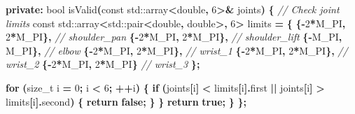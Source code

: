 \documentclass[
]{article}
\newenvironment{Shaded}{\begin{snugshade}}{\end{snugshade}}
\newcommand{\AttributeTok}[1]{\textcolor[rgb]{0.13,0.29,0.53}{#1}}
\newcommand{\BuiltInTok}[1]{#1}
\newcommand{\CommentTok}[1]{\textcolor[rgb]{0.56,0.35,0.01}{\textit{#1}}}
\newcommand{\ControlFlowTok}[1]{\textcolor[rgb]{0.13,0.29,0.53}{\textbf{#1}}}
\newcommand{\DataTypeTok}[1]{\textcolor[rgb]{0.13,0.29,0.53}{#1}}
\newcommand{\DecValTok}[1]{\textcolor[rgb]{0.00,0.00,0.81}{#1}}
\newcommand{\KeywordTok}[1]{\textcolor[rgb]{0.13,0.29,0.53}{\textbf{#1}}}
\newcommand{\NormalTok}[1]{#1}
\newcommand{\OperatorTok}[1]{\textcolor[rgb]{0.81,0.36,0.00}{\textbf{#1}}}
\begin{document}
\begin{Shaded}
\begin{Highlighting}[]
\KeywordTok{private}\OperatorTok{:}
    \DataTypeTok{bool}\NormalTok{ isValid}\OperatorTok{(}\AttributeTok{const} \BuiltInTok{std::}\NormalTok{array}\OperatorTok{\textless{}}\DataTypeTok{double}\OperatorTok{,} \DecValTok{6}\OperatorTok{\textgreater{}\&}\NormalTok{ joints}\OperatorTok{)} \OperatorTok{\{}
        \CommentTok{// Check joint limits}
        \AttributeTok{const} \BuiltInTok{std::}\NormalTok{array}\OperatorTok{\textless{}}\BuiltInTok{std::}\NormalTok{pair}\OperatorTok{\textless{}}\DataTypeTok{double}\OperatorTok{,} \DataTypeTok{double}\OperatorTok{\textgreater{},} \DecValTok{6}\OperatorTok{\textgreater{}}\NormalTok{ limits }\OperatorTok{=} \OperatorTok{\{}
            \OperatorTok{\{{-}}\DecValTok{2}\OperatorTok{*}\NormalTok{M\_PI}\OperatorTok{,} \DecValTok{2}\OperatorTok{*}\NormalTok{M\_PI}\OperatorTok{\},}  \CommentTok{// shoulder\_pan}
            \OperatorTok{\{{-}}\DecValTok{2}\OperatorTok{*}\NormalTok{M\_PI}\OperatorTok{,} \DecValTok{2}\OperatorTok{*}\NormalTok{M\_PI}\OperatorTok{\},}  \CommentTok{// shoulder\_lift}
            \OperatorTok{\{{-}}\NormalTok{M\_PI}\OperatorTok{,}\NormalTok{ M\_PI}\OperatorTok{\},}      \CommentTok{// elbow}
            \OperatorTok{\{{-}}\DecValTok{2}\OperatorTok{*}\NormalTok{M\_PI}\OperatorTok{,} \DecValTok{2}\OperatorTok{*}\NormalTok{M\_PI}\OperatorTok{\},}  \CommentTok{// wrist\_1}
            \OperatorTok{\{{-}}\DecValTok{2}\OperatorTok{*}\NormalTok{M\_PI}\OperatorTok{,} \DecValTok{2}\OperatorTok{*}\NormalTok{M\_PI}\OperatorTok{\},}  \CommentTok{// wrist\_2}
            \OperatorTok{\{{-}}\DecValTok{2}\OperatorTok{*}\NormalTok{M\_PI}\OperatorTok{,} \DecValTok{2}\OperatorTok{*}\NormalTok{M\_PI}\OperatorTok{\}}   \CommentTok{// wrist\_3}
        \OperatorTok{\};}

        \ControlFlowTok{for} \OperatorTok{(}\DataTypeTok{size\_t}\NormalTok{ i }\OperatorTok{=} \DecValTok{0}\OperatorTok{;}\NormalTok{ i }\OperatorTok{\textless{}} \DecValTok{6}\OperatorTok{;} \OperatorTok{++}\NormalTok{i}\OperatorTok{)} \OperatorTok{\{}
            \ControlFlowTok{if} \OperatorTok{(}\NormalTok{joints}\OperatorTok{[}\NormalTok{i}\OperatorTok{]} \OperatorTok{\textless{}}\NormalTok{ limits}\OperatorTok{[}\NormalTok{i}\OperatorTok{].}\NormalTok{first }\OperatorTok{||}\NormalTok{ joints}\OperatorTok{[}\NormalTok{i}\OperatorTok{]} \OperatorTok{\textgreater{}}\NormalTok{ limits}\OperatorTok{[}\NormalTok{i}\OperatorTok{].}\NormalTok{second}\OperatorTok{)} \OperatorTok{\{}
                \ControlFlowTok{return} \KeywordTok{false}\OperatorTok{;}
            \OperatorTok{\}}
        \OperatorTok{\}}
        \ControlFlowTok{return} \KeywordTok{true}\OperatorTok{;}
    \OperatorTok{\}}
\OperatorTok{\};}
\end{Highlighting}
\end{Shaded}
\end{document}
